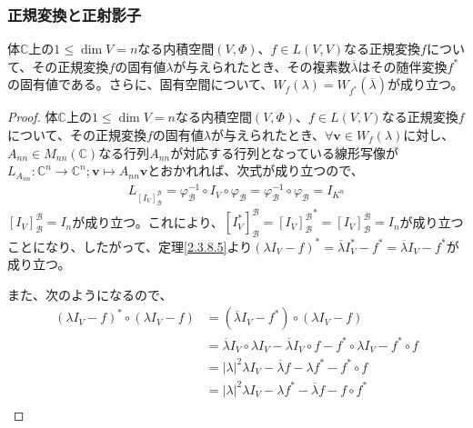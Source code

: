 \documentclass[dvipdfmx]{jsarticle}
\begin{document}
\subsubsection{正規変換と正射影子}%
\begin{thm}\label{2.3.9.9}
体$\mathbb{C}$上の$1 \leq \dim V = n$なる内積空間$(V,\varPhi)$、$f \in L(V,V)$なる正規変換$f$について、その正規変換$f$の固有値$\lambda$が与えられたとき、その複素数$\overline{\lambda}$はその随伴変換$f^{*}$の固有値である。さらに、固有空間について、$W_{f}(\lambda) = W_{f^{*}}\left( \overline{\lambda} \right)$が成り立つ。
\end{thm}
\begin{proof}
体$\mathbb{C}$上の$1 \leq \dim V = n$なる内積空間$(V,\varPhi)$、$f \in L(V,V)$なる正規変換$f$について、その正規変換$f$の固有値$\lambda$が与えられたとき、$\forall\mathbf{v} \in W_{f}(\lambda)$に対し、$A_{nn} \in M_{nn}\left( \mathbb{C} \right)$なる行列$A_{nn}$が対応する行列となっている線形写像が$L_{A_{nn}}:\mathbb{C}^{n} \rightarrow \mathbb{C}^{n};\mathbf{v} \mapsto A_{nn}\mathbf{v}$とおかれれば、次式が成り立つので、
\begin{align*}
L_{\left[ I_{V} \right]_{\mathcal{B}}^{\mathcal{B}}} = \varphi_{\mathcal{B}}^{- 1} \circ I_{V} \circ \varphi_{\mathcal{B}} = \varphi_{\mathcal{B}}^{- 1} \circ \varphi_{\mathcal{B}} = I_{K^{n}}
\end{align*}
$\left[ I_{V} \right]_{\mathcal{B}}^{\mathcal{B}} = I_{n}$が成り立つ。これにより、$\left[ I_{V}^{*} \right]_{\mathcal{B}}^{\mathcal{B}} = {\left[ I_{V} \right]_{\mathcal{B}}^{\mathcal{B}}}^{*} = \left[ I_{V} \right]_{\mathcal{B}}^{\mathcal{B}} = I_{n}$が成り立つことになり、したがって、定理\ref{2.3.8.5}より$\left( \lambda I_{V} - f \right)^{*} = \overline{\lambda}I_{V}^{*} - f^{*} = \overline{\lambda}I_{V} - f^{*}$が成り立つ。\par
また、次のようになるので、
\begin{align*}
\left( \lambda I_{V} - f \right)^{*} \circ \left( \lambda I_{V} - f \right) &= \left( \overline{\lambda}I_{V} - f^{*} \right) \circ \left( \lambda I_{V} - f \right)\\
&= \overline{\lambda}I_{V} \circ \lambda I_{V} - \overline{\lambda}I_{V} \circ f - f^{*} \circ \lambda I_{V} - f^{*} \circ f\\
&= |\lambda|^{2}\lambda I_{V} - \overline{\lambda}f - \lambda f^{*} - f^{*} \circ f\\
&= |\lambda|^{2}\lambda I_{V} - \lambda f^{*} - \overline{\lambda}f - f \circ f^{*}\\

\end{align*}
\end{proof}
\end{document}
